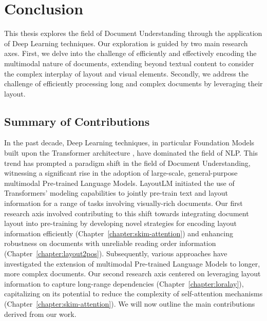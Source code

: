 
\chapter{Conclusion}
\label{chapter:conclusion}

\acresetall
{}


This thesis explores the field of Document Understanding through the application of Deep Learning techniques. Our exploration is guided by two main research axes. First, we delve into the challenge of efficiently and effectively encoding the multimodal nature of documents, extending beyond textual content to consider the complex interplay of layout and visual elements. Secondly, we address the challenge of efficiently processing long and complex documents by leveraging their layout.

\section{Summary of Contributions}

In the past decade, Deep Learning techniques, in particular Foundation Models \citep{devlin2018bert, radford2019language, touvron2023llama} built upon the Transformer architecture \citep{vaswani2017attention}, have dominated the field of \ac{NLP}. This trend has prompted a paradigm shift in the field of Document Understanding, witnessing a significant rise in the adoption of large-scale, general-purpose multimodal Pre-trained Language Models. LayoutLM \citep{xu2020layoutlm} initiated the use of Transformers' modeling capabilities to jointly pre-train text and layout information for a range of tasks involving visually-rich documents. Our first research axis involved contributing to this shift towards integrating document layout into pre-training by developing novel strategies for encoding layout information efficiently (Chapter~\ref{chapter:skim-attention}) and enhancing robustness on documents with unreliable reading order information (Chapter~\ref{chapter:layout2pos}). Subsequently, various approaches have investigated the extension of multimodal Pre-trained Language Models to longer, more complex documents. Our second research axis centered on leveraging layout information to capture long-range dependencies (Chapter~\ref{chapter:loralay}), capitalizing on its potential to reduce the complexity of self-attention mechanisms (Chapter~\ref{chapter:skim-attention}). We will now outline the main contributions derived from our work.

